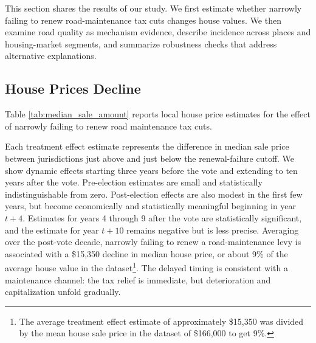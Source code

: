 ﻿This section shares the results of our study. We first estimate whether narrowly failing to renew road-maintenance tax cuts changes house values. We then examine road quality as mechanism evidence, describe incidence across places and housing-market segments, and summarize robustness checks that address alternative explanations.

\subsection{House Prices Decline}

Table \ref{tab:median_sale_amount} reports local house price estimates for the effect of narrowly failing to renew road maintenance tax cuts.

\noindent Each treatment effect estimate represents the difference in median sale price between jurisdictions just above and just below the renewal-failure cutoff. We show dynamic effects starting three years before the vote and extending to ten years after the vote. Pre-election estimates are small and statistically indistinguishable from zero. Post-election effects are also modest in the first few years, but become economically and statistically meaningful beginning in year $t+4$. Estimates for years 4 through 9 after the vote are statistically significant, and the estimate for year $t+10$ remains negative but is less precise. Averaging over the post-vote decade, narrowly failing to renew a road-maintenance levy is associated with a \$15,350 decline in median house price, or about 9\% of the average house value in the dataset\footnote{The average treatment effect estimate of approximately \$15,350 was divided by the mean house sale price in the dataset of \$166,000 to get 9\%.}. The delayed timing is consistent with a maintenance channel: the tax relief is immediate, but deterioration and capitalization unfold gradually.

